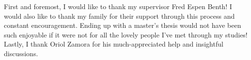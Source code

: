 \begin{acknowledgements}
\markboth{}{} %
First and foremost, I would like to thank my supervisor Fred Espen Benth! I would also like to thank my family for their support through this process and constant encouragement. Ending up with a master's thesis would not have been such enjoyable if it were not for all the lovely people I've met through my studies! Lastly, I thank Oriol Zamora for his much-appreciated help and insightful discussions. 
\end{acknowledgements}